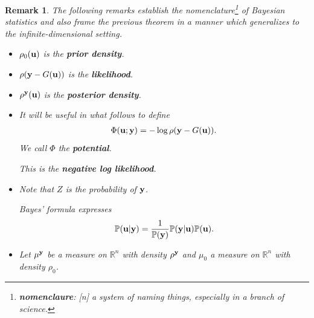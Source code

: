 \documentclass[oneside]{article}
\numberwithin{equation}{section}
\newtheorem{remark}{Remark}[section]
\begin{document}
\begin{remark}
    The following remarks establish the nomenclature\footnote{\textbf{nomenclaure}: [n] a system of naming things, especially in a branch of science.} of Bayesian statistics and also frame the previous theorem in a manner which generalizes to the infinite-dimensional setting.
    \begin{itemize}
        \item $\rho_0({\bf u})$ is the \textbf{prior density}.
        \item $\rho({\bf y} - G({\bf u}))$ is the \textbf{likelihood}.
        \item $\rho^{\bf y}({\bf u})$ is the \textbf{posterior density}.
        \item It will be useful in what follows to define
        \begin{align*}
            \Phi({\bf u};{\bf y}) = -\log\rho({\bf y} - G({\bf u})).
        \end{align*}
        We call $\Phi$ the \textbf{potential}.
        
        This is the \textbf{negative log likelihood}.
        \item Note that $Z$ is the probability of ${\bf y}$.
        
        Bayes' formula expresses
        \begin{align*}
            \mathbb{P}({\bf u}|{\bf y}) = \frac{1}{\mathbb{P}({\bf y})}\mathbb{P}({\bf y}|{\bf u})\mathbb{P}({\bf u}).
        \end{align*}
        \item Let $\mu^{\bf y}$ be a measure on $\mathbb{R}^n$ with density $\rho^{\bf y}$ and $\mu_0$ a measure on $\mathbb{R}^n$ with density $\rho_0$.
        

\end{itemize}
\end{remark}
\end{document}
